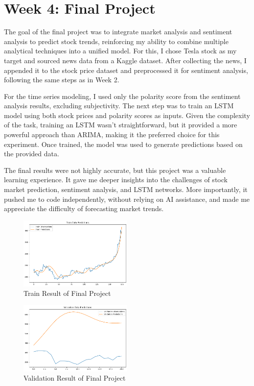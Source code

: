 \documentclass[12pt,a4paper]{article}
\begin{document}
\newpage

\section{Week 4: Final Project}
The goal of the final project was to integrate market analysis and sentiment analysis to predict stock trends, reinforcing my ability to combine multiple analytical techniques into a unified model. For this, I chose Tesla stock as my target and sourced news data from a Kaggle dataset. After collecting the news, I appended it to the stock price dataset and preprocessed it for sentiment analysis, following the same steps as in Week 2.

For the time series modeling, I used only the polarity score from the sentiment analysis results, excluding subjectivity. The next step was to train an LSTM model using both stock prices and polarity scores as inputs. Given the complexity of the task, training an LSTM wasn’t straightforward, but it provided a more powerful approach than ARIMA, making it the preferred choice for this experiment. Once trained, the model was used to generate predictions based on the provided data.

The final results were not highly accurate, but this project was a valuable learning experience. It gave me deeper insights into the challenges of stock market prediction, sentiment analysis, and LSTM networks. More importantly, it pushed me to code independently, without relying on AI assistance, and made me appreciate the difficulty of forecasting market trends.
\begin{figure}[!h]
    \centering
    \includegraphics[width=0.5\textwidth]{Week4_train_results.png} %
    \caption{Train Result of Final Project}
    \label{fig14}
\end{figure}

\begin{figure}[!h]
    \centering
    \includegraphics[width=0.5\textwidth]{Week4_validation_results.png} %
    \caption{Validation Result of Final Project}
    \label{fig15}
\end{figure}
\end{document}
